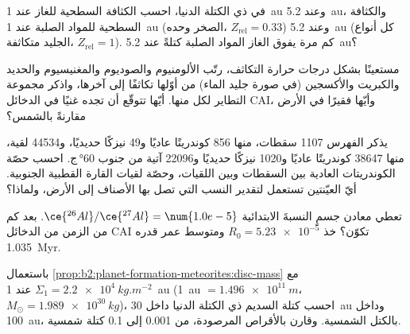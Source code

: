\begin{exercise}[$\star$]\label{exo:b2:planet-formation-meteorites:1}
في  ذي الكتلة الدنيا، احسب الكثافة السطحية للغاز عند
\qty{1}{au} وعند \qty{5.2}{au}، والكثافة السطحية للمواد الصلبة عند
\qty{1}{au} (الصخر وحده، $Z_{\mathrm{rel}} = 0.33$) وعند \qty{5.2}{au} (كل أنواع الجليد
متكاثفة، $Z_{\mathrm{rel}} = 1$). كم مرة يفوق الغاز المواد الصلبة كتلةً
عند \qty{5.2}{au}؟
\end{exercise}

\begin{exercise}[$\star$]\label{exo:b2:planet-formation-meteorites:2}
مستعينًا بشكل درجات حرارة التكاثف، رتّب الألومنيوم والصوديوم
والمغنيسيوم والحديد والكبريت والأكسجين (في صورة جليد الماء) من أوّلها تكاثفًا إلى
آخرها، واذكر مجموعة التطاير لكل منها. أيّها تتوقّع
أن تجده غنيًا في الدخائل CAI، وأيّها فقيرًا في الأرض مقارنةً بالشمس؟
\end{exercise}

\begin{exercise}[$\star$]\label{exo:b2:planet-formation-meteorites:3}
يذكر الفهرس \num{1107} سقطات، منها 856 كوندريتًا عاديًا
و49 نيزكًا حديديًا، و\num{44534} لقية، منها \num{38647} كوندريتًا عاديًا
و\num{1020} نيزكًا حديديًا و\num{22096} آتية من جنوب \ang{60}\,ج. احسب
حصّة الكوندريتات العادية  بين السقطات وبين اللقيات،
وحصّة لقيات القارة القطبية الجنوبية. أيّ العيّنتين تستعمل لتقدير
النسب التي تصل بها الأصناف إلى الأرض، ولماذا؟
\end{exercise}

\begin{exercise}[$\star$]\label{exo:b2:planet-formation-meteorites:4}
تعطي معادن جسمٍ النسبةَ الابتدائية
$\ce{^{26}Al}/\ce{^{27}Al} = \num{1.0e-5}$. بعد كم من الزمن من الدخائل CAI تكوّن؟
خذ $R_0 = \num{5.23e-5}$ ومتوسط عمر قدره \qty{1.035}{Myr}.
\end{exercise}

\begin{exercise}[$\star\star$]\label{exo:b2:planet-formation-meteorites:5}
باستعمال \cref{prop:b2:planet-formation-meteorites:disc-mass} مع
$\Sigma_1 = \qty{2.2e4}{kg.m^{-2}}$ عند \qty{1}{au} (\qty{1}{au} $=
\qty{1.496e11}{m}$، $M_\odot = \qty{1.989e30}{kg}$)، احسب كتلة
السديم ذي الكتلة الدنيا داخل \qty{30}{au} وداخل \qty{100}{au}، بالكتل
الشمسية. وقارن بالأقراص المرصودة، من 0.001 إلى 0.1 كتلة شمسية.
\end{exercise}

